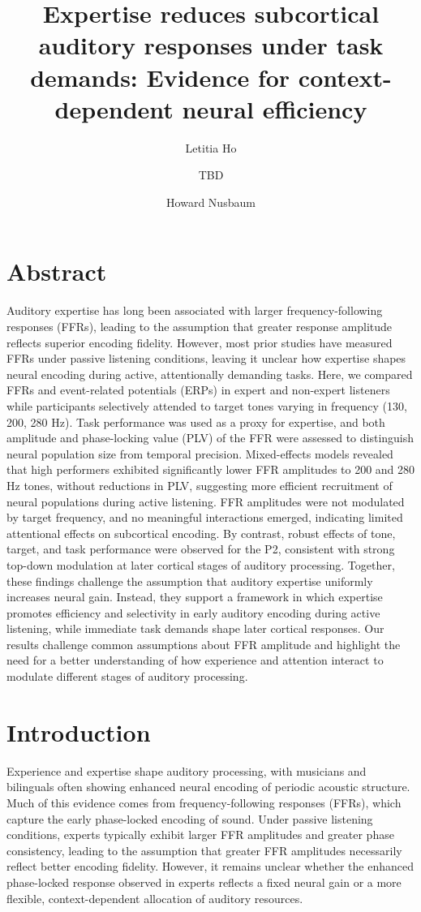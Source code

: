 \documentclass{article}
\title{Expertise reduces subcortical auditory responses under task demands: Evidence for context-dependent neural efficiency}
\author[1]{Letitia Ho}
\author[1]{TBD}
\author[2]{Howard Nusbaum}
\affil[1]{Department of Psychology, University of Chicago, Chicago, IL, USA}
\affil[*]{Corresponding author: letitiayhho@uchicago.edu}
\date{} %
\begin{document}
\maketitle

\section*{Abstract}

Auditory expertise has long been associated with larger frequency-following responses (FFRs), leading to the assumption that greater response amplitude reflects superior encoding fidelity. However, most prior studies have measured FFRs under passive listening conditions, leaving it unclear how expertise shapes neural encoding during active, attentionally demanding tasks. Here, we compared FFRs and event-related potentials (ERPs) in expert and non-expert listeners while participants selectively attended to target tones varying in frequency (130, 200, 280 Hz). Task performance was used as a proxy for expertise, and both amplitude and phase-locking value (PLV) of the FFR were assessed to distinguish neural population size from temporal precision. Mixed-effects models revealed that high performers exhibited significantly lower FFR amplitudes to 200 and 280 Hz tones, without reductions in PLV, suggesting more efficient recruitment of neural populations during active listening. FFR amplitudes were not modulated by target frequency, and no meaningful interactions emerged, indicating limited attentional effects on subcortical encoding. By contrast, robust effects of tone, target, and task performance were observed for the P2, consistent with strong top-down modulation at later cortical stages of auditory processing. Together, these findings challenge the assumption that auditory expertise uniformly increases neural gain. Instead, they support a framework in which expertise promotes efficiency and selectivity in early auditory encoding during active listening, while immediate task demands shape later cortical responses. Our results challenge common assumptions about FFR amplitude and highlight the need for a better understanding of how experience and attention interact to modulate different stages of auditory processing.

\section*{Introduction}

Experience and expertise shape auditory processing, with musicians and bilinguals often showing enhanced neural encoding of periodic acoustic structure. Much of this evidence comes from frequency-following responses (FFRs), which capture the early phase-locked encoding of sound. Under passive listening conditions, experts typically exhibit larger FFR amplitudes and greater phase consistency, leading to the assumption that greater FFR amplitudes necessarily reflect better encoding fidelity. However, it remains unclear whether the enhanced phase-locked response observed in experts reflects a fixed neural gain or a more flexible, context-dependent allocation of auditory resources.
\end{document}
